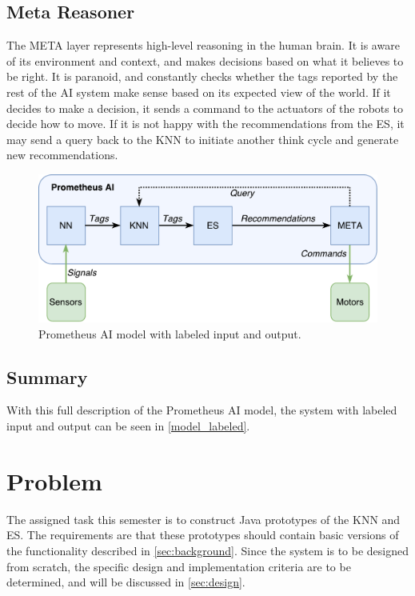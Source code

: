 \documentclass[titlepage,11pt]{article}
\begin{document}
\subsection{Meta Reasoner}

The META layer represents high-level reasoning in the human brain. It is aware of its environment and context, and makes decisions based on what it believes to be right. It is paranoid, and constantly checks whether the tags reported by the rest of the AI system make sense based on its expected view of the world. If it decides to make a decision, it sends a command to the actuators of the robots to decide how to move. If it is not happy with the recommendations from the ES, it may send a query back to the KNN to initiate another think cycle and generate new recommendations.

\begin{figure}[!htb]
	\includegraphics[width=\textwidth]{figures/ai_model_labeled.pdf}
	\caption{Prometheus AI model with labeled input and output.}
	\label{model_labeled}
\end{figure}

\subsection{Summary}

With this full description of the Prometheus AI model, the system with labeled input and output can be seen in \autoref{model_labeled}.

\section{Problem}
\label{sec:problem}

The assigned task this semester is to construct Java prototypes of the KNN and ES. The requirements are that these prototypes should contain basic versions of the functionality described in \autoref{sec:background}. Since the system is to be designed from scratch, the specific design and implementation criteria are to be determined, and will be discussed in \autoref{sec:design}.
\end{document}
